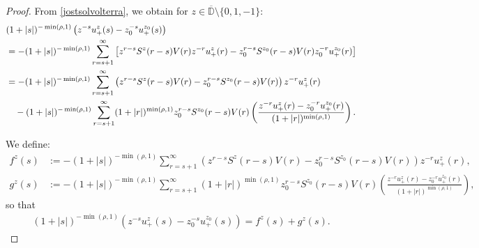 \documentclass[12pt,oneside,onecolumn,open]{article}
\begin{document}
\begin{proof}
    From \eqref{jostsolvolterra}, we obtain for $z\in \overline{\mathbb{D}}\setminus \{0, 1, -1\}$:
    \begin{align}\label{b}
        &(1+|s|)^{-\min(\rho, 1 )} \left( z^{-s} u_{+}^{z}(s) - z_{0}^{-s} u_{+}^{z_{0}}(s) \right) \\
        &\notag = - (1+|s|)^{-\min(\rho, 1 )} \sum_{r=s+1}^{\infty} \left[ z^{r-s} S^{z}(r-s) V(r) z^{-r} u_{+}^{z}(r) - z_{0}^{r-s} S^{z_{0}}(r-s) V(r) z_{0}^{-r} u_{+}^{z_{0}}(r) \right] \\
        &\notag = - (1+|s|)^{-\min(\rho, 1 )} \sum_{r=s+1}^{\infty} \left( z^{r-s} S^{z}(r-s) V(r) - z_{0}^{r-s} S^{z_{0}}(r-s) V(r) \right) z^{-r} u_{+}^{z}(r) \\
        &\notag \quad - (1+|s|)^{-\min(\rho, 1 )} \sum_{r=s+1}^{\infty} (1+|r|)^{\min(\rho, 1 )} z_{0}^{r-s} S^{z_{0}}(r-s) V(r) \left( \frac{z^{-r} u_{+}^{z}(r) - z_{0}^{-r} u_{+}^{z_{0}}(r)}{(1+|r|)^{\min(\rho, 1 )}} \right).
    \end{align}
    
    We define:
    \begin{align}\label{f}
        f^{z}(s) &:= - (1+|s|)^{-\min(\rho, 1 )} \sum_{r=s+1}^{\infty} \left( z^{r-s} S^{z}(r-s) V(r) - z_{0}^{r-s} S^{z_{0}}(r-s) V(r) \right) z^{-r} u_{+}^{z}(r), \\
        g^{z}(s) &:= - (1+|s|)^{-\min(\rho, 1 )} \sum_{r=s+1}^{\infty} (1+|r|)^{\min(\rho, 1 )} z_{0}^{r-s} S^{z_{0}}(r-s) V(r) \left( \frac{z^{-r} u_{+}^{z}(r) - z_{0}^{-r} u_{+}^{z_{0}}(r)}{(1+|r|)^{\min(\rho, 1 )}} \right),
    \end{align}
    so that
    \begin{align}\label{c}
        (1+|s|)^{-\min(\rho, 1 )} \left( z^{-s} u_{+}^{z}(s) - z_{0}^{-s} u_{+}^{z_{0}}(s) \right) = f^{z}(s) + g^{z}(s).
    \end{align}
    

\end{proof}
\end{document}
